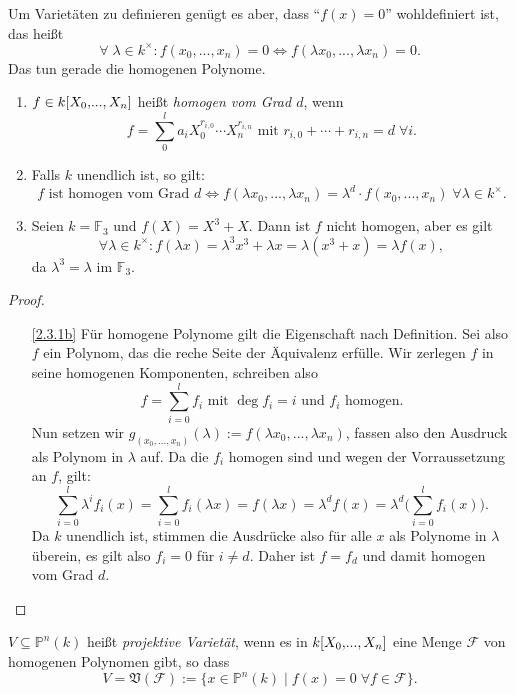 \documentclass[a4paper,12pt]{scrbook}
\newtheorem{proof}{Beweis}
\def\V{\mathfrak{V}}
\def\P{\mathbb{P}}
\newcommand{\F}{\mathcal{F}}
\newcommand{\FF}{\mathbb{F}}
\renewcommand{\dotsc}{\ensuremath{\!...}}
\newcommand{\ppolyx}[1][n]{\ensuremath%
  [X_{0},\dotsc,X_{#1}]}
\begin{document}
Um Varietäten zu definieren genügt es aber, dass \enquote{$f(x)=0$} wohldefiniert ist, das heißt
\[\forall\;\lambda\in k^{\times}\colon  f(x_{0},\dotsc,x_{n})=0\iff f(\lambda x_{0},\dotsc,\lambda x_{n})=0.\]
Das tun gerade die homogenen Polynome.

\begin{erinnerung}\label{2.3.1}\begin{enumerate}
\item{} $f\in k\ppolyx$ heißt \emph{homogen vom Grad $d$}, wenn
\[f=\sum_{0}^{l}a_{i}X_{0}^{r_{i,0}}\dotsm X_{n}^{r_{i,n}}\text{ mit }r_{i,0}+\dotsm+r_{i,n}=d\;\forall i.\]
\item{} Falls $k$ unendlich ist, so gilt:
\[f\text{ ist homogen vom Grad }d\iff f(\lambda x_{0},\dotsc,\lambda x_{n}) = \lambda^{d}\cdot f(x_{0},\dotsc,x_{n})\;\forall\lambda\in k^{\times}.\]
\item{} Seien $k=\FF_{3}$ und $f(X)=X^{3}+X$. Dann ist $f$ nicht homogen, aber es gilt
\[\forall\lambda\in k^{\times}\colon  f(\lambda x)=\lambda^{3}x^{3}+\lambda x=\lambda(x^{3}+x)=\lambda f(x),\]
da $\lambda^{3}=\lambda$ im $\FF_{3}$.
\end{enumerate}\end{erinnerung}
\begin{proof}\begin{enumerate}
\item[\ref{2.3.1b}] Für homogene Polynome gilt die Eigenschaft nach Definition. Sei also $f$ ein Polynom, das die reche Seite der Äquivalenz erfülle. Wir zerlegen $f$ in seine homogenen Komponenten, schreiben also
\[f=\sum_{i=0}^{l}f_{i}\text{ mit }\deg{f_{i}}=i\text{ und }f_{i}\text{ homogen.}\]
Nun setzen wir $g_{(x_{0},\dotsc,x_{n})}(\lambda):=f(\lambda x_{0},\dotsc,\lambda x_{n})$, fassen also den Ausdruck als Polynom in $\lambda$ auf. Da die $f_{i}$ homogen sind und wegen der Vorraussetzung an $f$, gilt:\vspace*{-10pt}
\[\sum_{i=0}^{l}\lambda^{i}f_{i}(x) = \sum_{i=0}^{l}f_{i}(\lambda x) = f(\lambda x)=\lambda^{d}f(x) = \lambda^{d}\biggl(\sum_{i=0}^{l}f_{i}(x)\biggr).\]
Da $k$ unendlich ist, stimmen die Ausdrücke also für alle $x$ als Polynome in $\lambda$ überein, es gilt also $f_{i}=0$ für $i\neq d$. Daher ist $f=f_{d}$ und damit homogen vom Grad $d$.
\end{enumerate}\end{proof}

\begin{dfn}\label{2.3.2}
$V\subseteq\P^{n}(k)$ heißt \emph{projektive Varietät}, wenn es in $k\ppolyx$ eine Menge $\F$ von homogenen Polynomen gibt, so dass
\[V=\V(\F):=\{x\in\P^{n}(k)\mid f(x)=0\;\forall f\in\F\}.\]
\end{dfn}
\end{document}
